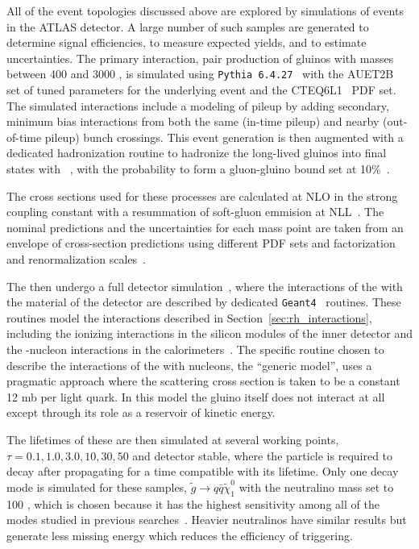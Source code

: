 All of the event topologies discussed above are explored by simulations of \rhadron events in the \ac{ATLAS} detector. 
A large number of such samples are generated to determine signal efficiencies, to measure expected yields, and to estimate uncertainties. 
The primary interaction, pair production of gluinos with masses between 400 and 3000 \GeV, is simulated using \texttt{Pythia 6.4.27}~\cite{pythia6}  with the AUET2B~\cite{ATL-PHYS-PUB-2011-014} set of tuned parameters for the underlying event and the CTEQ6L1~\cite{CTEQ} \ac{PDF} set.
The simulated interactions include a modeling of pileup by adding secondary, minimum bias interactions from both the same (in-time pileup) and nearby (out-of-time pileup) bunch crossings.
This event generation is then augmented with a dedicated hadronization routine to hadronize the long-lived gluinos into final states with \rhadrons~\cite{heavy_hadronization}, with the probability to form a gluon-gluino bound set at 10\%~\cite{Fairbairn:2006gg}.

The cross sections used for these processes are calculated at \ac{NLO} in the strong coupling constant with a resummation of soft-gluon emmision at \ac{NLL}~\cite{Beenakker:1996ch,Kulesza:2008jb,Kulesza:2009kq,Beenakker:2009ha,Beenakker:2011fu}.
The nominal predictions and the uncertainties for each mass point are taken from an envelope of cross-section predictions using different \ac{PDF} sets and factorization and renormalization scales~\cite{Kramer:2012bx}.

The \rhadrons then undergo a full detector simulation~\cite{}, where the interactions of the \rhadrons with the material of the detector are described by dedicated \texttt{Geant4}~\cite{GEANT4} routines. 
These routines model the interactions described in Section~\ref{sec:rh_interactions}, including the ionizing interactions in the silicon modules of the inner detector and the \rhadron-nucleon interactions in the calorimeters~\cite{Mackeprang:2006gx, Mackeprang:2009ad}.
The specific routine chosen to describe the interactions of the \rhadrons with nucleons, the ``generic model'', uses a pragmatic approach where the scattering cross section is taken to be a constant 12 mb per light quark.
In this model the gluino itself does not interact at all except through its role as a reservoir of kinetic energy.

The lifetimes of these \rhadrons are then simulated at several working points, $\tau = 0.1, 1.0, 3.0, 10, 30, 50$ and detector stable, where the particle is required to decay after propagating for a time compatible with its lifetime.
Only one decay mode is simulated for these samples, $\tilde{g} \rightarrow q\bar{q}\tilde{\chi}_1^0$ with the neutralino mass set to 100 \GeV, which is chosen because it has the highest sensitivity among all of the modes studied in previous searches~\cite{SUSY-2014-09}.
Heavier neutralinos have similar results but generate less missing energy which reduces the efficiency of triggering.

